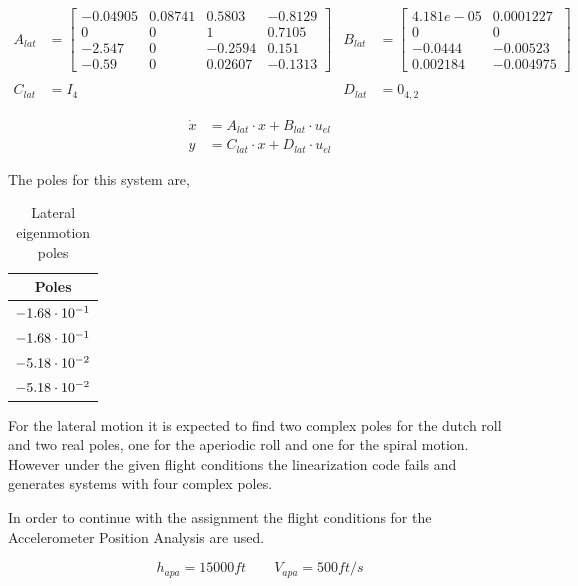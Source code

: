 \begin{align*}
    A_{lat}&=\begin{bmatrix}
        -0.04905 & 0.08741 &  0.5803 & -0.8129 \\
               0 &       0 &       1 &  0.7105 \\
          -2.547 &       0 & -0.2594 &   0.151 \\
           -0.59 &       0 & 0.02607 & -0.1313
    \end{bmatrix} &
    B_{lat}&=\begin{bmatrix}
        4.181e-05 & 0.0001227 \\
                0 &         0 \\
          -0.0444 &  -0.00523 \\
         0.002184 & -0.004975 
    \end{bmatrix} \\\\
    C_{lat}&=I_4 &
    D_{lat}&=0_{4,2}
\end{align*}

\begin{align}    
    \dot{x} &= A_{lat} \cdot x + B_{lat} \cdot u_{el} \nonumber\\
    y &= C_{lat} \cdot x + D_{lat} \cdot u_{el} \label{eq:ssaclat}
\end{align}

The poles for this system are,
\begin{table}[h!]
    \centering
    \begin{tabular}{ c }
        Poles \\ \hline \hline
        $-1.68\cdot 10^{-1}$ \\
        $-1.68\cdot 10^{-1}$ \\
        $-5.18\cdot 10^{-2}$ \\
        $-5.18\cdot 10^{-2}$ \\
    \end{tabular}
    \caption{Lateral eigenmotion poles}
\end{table}

For the lateral motion it is expected to find two complex poles for the dutch roll and two real poles, one for the aperiodic roll and one for the spiral motion. However under the given flight conditions the linearization code fails and generates systems with four complex poles.

In order to continue with the assignment the flight conditions for the Accelerometer Position Analysis are used.

\begin{equation*}
    h_{apa} = 15000ft \qquad  V_{apa}=500ft/s
\end{equation*}

